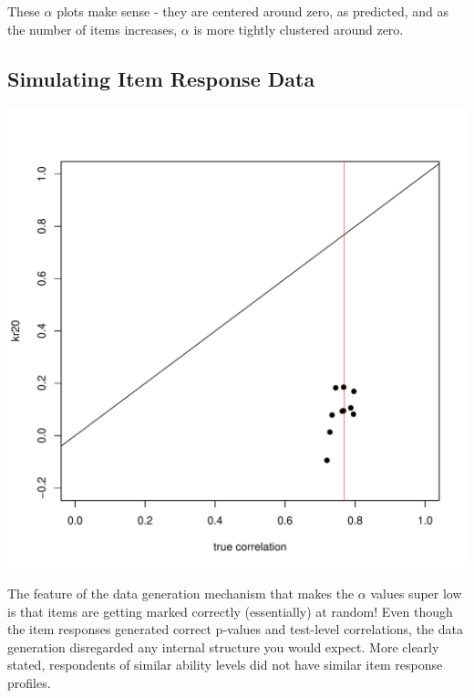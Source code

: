 \documentclass{article}\usepackage[]{graphicx}\usepackage[]{color}
\makeatletter
\def\maxwidth{ %
  \ifdim\Gin@nat@width>\linewidth
    \linewidth
  \else
    \Gin@nat@width
  \fi
}
\newenvironment{knitrout}{}{} %
\makeatother
\begin{document}
    These $\alpha$ plots make sense - they are centered around zero, as predicted, and as the number of items increases, $\alpha$ is more tightly clustered around zero.

  \subsection{Simulating Item Response Data}

\begin{knitrout}
\color{fgcolor}
\includegraphics[width=\maxwidth]{figure/unnamed-chunk-3-1} 

\end{knitrout}

The feature of the data generation mechanism that makes the $\alpha$ values super low is that items are getting marked correctly (essentially) at random!  Even though the item responses generated correct p-values and test-level correlations, the data generation disregarded any internal structure you would expect.  More clearly stated, respondents of similar ability levels did not have similar item response profiles.
\end{document}
